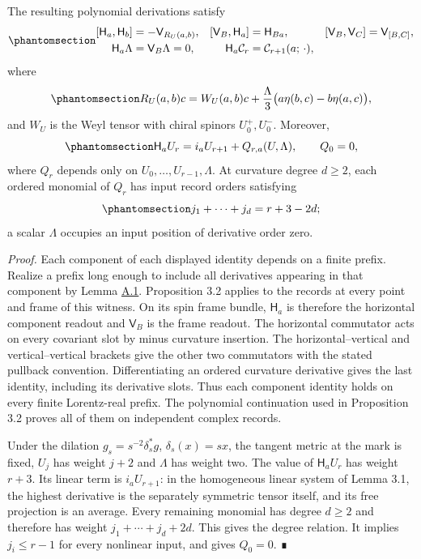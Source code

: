 \documentclass[
  english,
  11pt,
  reqno]{amsart}
\begin{document}
The resulting polynomial derivations satisfy
\begin{equation}\protect\phantomsection\label{eq:es-cartan-identities}{
 \begin{aligned}
 [\mathsf H_a,\mathsf H_b]&=-\mathsf V_{R_U(a,b)},&
 [\mathsf V_B,\mathsf H_a]&=\mathsf H_{Ba},&
 [\mathsf V_B,\mathsf V_C]&=\mathsf V_{[B,C]},\\
 \mathsf H_a\Lambda&=\mathsf V_B\Lambda=0,&
 \mathsf H_a\mathcal C_r&=\mathcal C_{r+1}(a;\,\cdot),
 \end{aligned}
}\end{equation} where
\begin{equation}\protect\phantomsection\label{eq:es-algebraic-curvature}{
 R_U(a,b)c=W_U(a,b)c+
 \frac{\Lambda}{3}\bigl(a\eta(b,c)-b\eta(a,c)\bigr),
}\end{equation} and \(W_U\) is the Weyl tensor with chiral spinors
\(U_0^+,U_0^-\). Moreover,
\begin{equation}\protect\phantomsection\label{eq:es-horizontal-polynomial}{
 \mathsf H_aU_r=i_aU_{r+1}+Q_{r,a}(U,\Lambda),\qquad Q_0=0,
}\end{equation} where \(Q_r\) depends only on
\(U_0,\ldots,U_{r-1},\Lambda\). At curvature degree \(d\ge2\), each
ordered monomial of \(Q_r\) has input record orders satisfying
\begin{equation}\protect\phantomsection\label{eq:es-completion-weight}{
 j_1+\cdots+j_d=r+3-2d;
}\end{equation} a scalar \(\Lambda\) occupies an input position of
derivative order zero.

\emph{Proof.} Each component of each displayed identity depends on a
finite prefix. Realize a prefix long enough to include all derivatives
appearing in that component by Lemma
\hyperref[lem:es-finite-witness]{A.1}. Proposition 3.2 applies to the
records at every point and frame of this witness. On its spin frame
bundle, \(\mathsf H_a\) is therefore the horizontal component readout
and \(\mathsf V_B\) is the frame readout. The horizontal commutator acts
on every covariant slot by minus curvature insertion. The
horizontal--vertical and vertical--vertical brackets give the other two
commutators with the stated pullback convention. Differentiating an
ordered curvature derivative gives the last identity, including its
derivative slots. Thus each component identity holds on every finite
Lorentz-real prefix. The polynomial continuation used in Proposition 3.2
proves all of them on independent complex records.

Under the dilation \(g_s=s^{-2}\delta_s^*g\), \(\delta_s(x)=sx\), the
tangent metric at the mark is fixed, \(U_j\) has weight \(j+2\) and
\(\Lambda\) has weight two. The value of \(\mathsf H_aU_r\) has weight
\(r+3\). Its linear term is \(i_aU_{r+1}\): in the homogeneous linear
system of Lemma 3.1, the highest derivative is the separately symmetric
tensor itself, and its free projection is an average. Every remaining
monomial has degree \(d\ge2\) and therefore has weight
\(j_1+\cdots+j_d+2d\). This gives the degree relation. It implies
\(j_i\le r-1\) for every nonlinear input, and gives \(Q_0=0\). ∎
\end{document}
